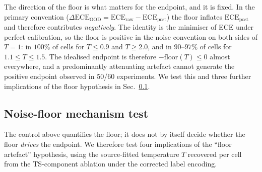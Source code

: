 \documentclass[review,12pt,nonatbib]{elsarticle}
\begin{document}
%
%
The direction of the floor is what matters for the endpoint, and it is
fixed. In the primary convention ($\Delta\text{ECE}_{\text{OOD}} =
\text{ECE}_{\text{raw}} - \text{ECE}_{\text{post}}$) the floor inflates
$\text{ECE}_{\text{post}}$ and therefore contributes \emph{negatively}.
The identity is the minimiser of ECE under perfect calibration, so the
floor is positive in the noise convention on both sides of $T=1$: in
$100\%$ of cells for $T \leq 0.9$ and $T \geq 2.0$, and in $90$--$97\%$
of cells for $1.1 \leq T \leq 1.5$. The idealised endpoint is therefore
$-\text{floor}(T) \leq 0$ almost everywhere, and a predominantly
attenuating artefact cannot generate the positive endpoint observed in
50/60 experiments. We test this and three further implications of the
floor hypothesis in Sec.~\ref{sec:noise_mechanism}.

\subsection{Noise-floor mechanism test}
\label{sec:noise_mechanism}
The control above quantifies the floor; it does not by itself decide
whether the floor \emph{drives} the endpoint. We therefore test four
implications of the ``floor artefact'' hypothesis, using the
source-fitted temperature $T$ recovered per cell from the TS-component
ablation under the corrected label encoding.
\end{document}
